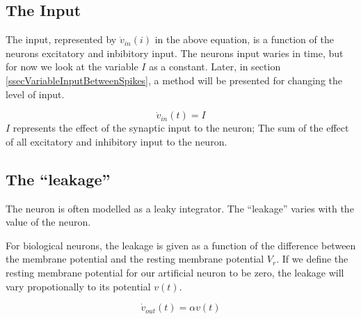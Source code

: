 \subsection{The Input}
The input, represented by $\dot{v}_{in}(i)$ in the above equation, is a function of the neurons excitatory and inbibitory input. 
The neurons input waries in time, but for now we look at the variable $I$ as a constant.
Later, in section \ref{ssecVariableInputBetweenSpikes}, a method will be presented for changing the level of input.  %

\begin{equation}
	\dot{v}_{in}(t) = I
\end{equation}
$I$ represents the effect of the synaptic input to the neuron; 
	The sum of the effect of all excitatory and inhibitory input to the neuron.



\subsection{The ``leakage''}
The neuron is often modelled as a leaky integrator. 
The ``leakage'' varies with the value of the neuron. %

For biological neurons, the leakage is given as a function of the difference between the membrane potential and the resting membrane potential $V_r$. 
If we define the resting membrane potential for our artificial neuron to be zero, the leakage will vary propotionally to its potential $v(t)$.

\begin{equation}
	\dot{v}_{out}(t) = \alpha v(t)
\end{equation}

